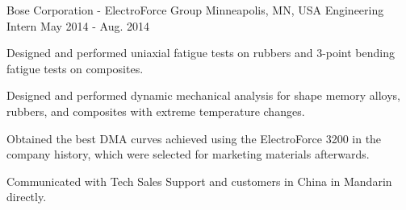 \begin{cventries}

 \cventryprojtrued
    {Bose Corporation - ElectroForce Group} %
    {Minneapolis, MN, USA} %
    {Engineering Intern} %
    {May 2014 - Aug. 2014} %
    {     
     \begin{cvitems} %
       \item {Designed and performed uniaxial fatigue tests on rubbers and 3-point bending fatigue tests on composites.}
       \item {Designed and performed dynamic mechanical analysis for shape memory alloys, rubbers, and composites with extreme temperature changes.}
       \item {Obtained the best DMA curves achieved using the ElectroForce 3200 in the company history, which were selected for marketing materials afterwards.}
       \item {Communicated with Tech Sales Support and customers in China in Mandarin directly.}       
      \end{cvitems}
         }


\end{cventries}
